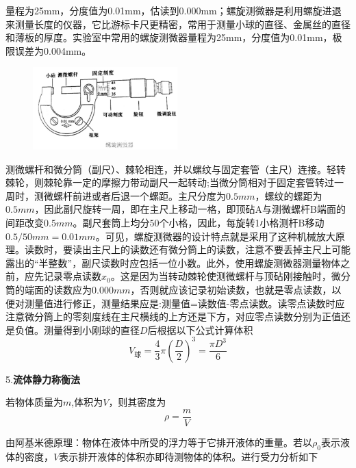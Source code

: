 \documentclass[12pt,a4paper,UTF8]{ctexart}
\begin{document}
\par 量程为25mm，分度值为0.01mm，估读到0.000mm；螺旋测微器是利用螺旋进退来测量长度的仪器，它比游标卡尺更精密，常用于测量小球的直径、金属丝的直径和薄板的厚度。实验室中常用的螺旋测微器量程为25mm，分度值为0.01mm，极限误差为0.004mm。
\begin{figure}[!htbp]
	\centering
	\includegraphics*[width=0.5\textwidth]{螺旋测微器.png}
\end{figure}
\par 测微螺杆和微分筒（副尺）、棘轮相连，并以螺纹与固定套管（主尺）连接。轻转棘轮，则棘轮靠一定的摩擦力带动副尺一起转动;当微分筒相对于固定套管转过一周时，测微螺杆前进或者后退一个螺距。主尺分度为$0.5mm$，螺纹的螺距为$0.5mm$，因此副尺旋转一周，即在主尺上移动一格，即顶砧A与测微螺杆B端面的间距改变$0.5mm$。副尺套筒上均分$50$个小格，因此，每旋转1小格测杆B移动$0.5/50mm=0.01mm$。可见，螺旋测微器的设计特点就是采用了这种机械放大原理。读数时，要读出主尺上的读数还有微分筒上的读数，注意不要丢掉主尺上可能露出的“半整数”，副尺读数时应包括一位小数。此外，使用螺旋测微器测量物体之前，应先记录零点读数$x_0$。这是因为当转动棘轮使测微螺杆与顶砧刚接触时，微分筒的端面的读数应为$0.000mm$，否则就应该记录初始读数，也就是零点读数，以便对测量值进行修正，测量结果应是:测量值=读数值-零点读数。读零点读数时应注意微分筒上的零刻度线在主尺横线的上方还是下方，对应零点读数分别为正值还是负值。测量得到小刚球的直径$D$后根据以下公式计算体积
\[
	V_{\text{球}}=\frac{4}{3}{\pi}(\frac{D}{2})^{3}=\frac{{\pi}D^{3}}{6}
\]
\par 5.\textbf{流体静力称衡法}
\par 若物体质量为$m$,体积为$V$，则其密度为
\[
	\rho = \frac{m}{V}
\]
\par 由阿基米德原理：物体在液体中所受的浮力等于它排开液体的重量。若以$\rho_0$表示液体的密度，$V$表示排开液体的体积亦即待测物体的体积。进行受力分析如下
\end{document}
